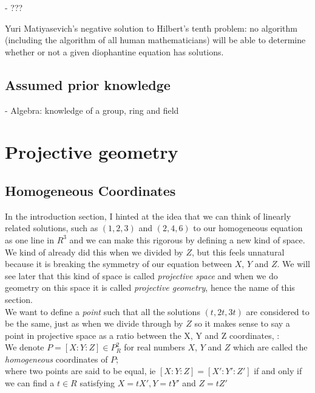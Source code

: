 \documentclass{article}
\begin{document}
- ???

Yuri Matiyasevich's negative solution to Hilbert's tenth problem: no algorithm (including the algorithm of all human mathematicians) will be able to determine whether or not a given diophantine equation has solutions.

\subsection{Assumed prior knowledge}

- Algebra: knowledge of a group, ring and field

\newpage

\section{Projective geometry}

\subsection{Homogeneous Coordinates}

In the introduction section, I hinted at the idea that we can think of linearly related solutions, such as $(1, 2, 3)$ and $(2, 4, 6)$ to our homogeneous equation  as one line in $R^3$ and we can make this rigorous by defining a new kind of space. We kind of already did this when we divided by $Z$, but this feels unnatural because it is breaking the symmetry of our equation between $X$, $Y$ and $Z$. We will see later that this kind of space is called \emph{projective space} and when we do geometry on this space it is called \emph{projective geometry}, hence the name of this section.\\

We want to define a \emph{point} such that all the solutions $(t, 2t, 3t)$ are considered to be the same, just as when we divide through by $Z$ so it makes sense to say a point in projective space as a ratio between the X, Y and Z coordinates, :\\

We denote $P = [X : Y : Z] \in P_R^2$ for real numbers $X$, $Y$ and $Z$ which are called the \emph{homogeneous} coordinates of $P$;\\

where two points are said to be equal, ie $[X : Y : Z] = [X' : Y' : Z']$ if and only if we can find a $t \in R$ satisfying $X = tX', Y =  tY'$ and $Z = tZ'$\\
\end{document}
